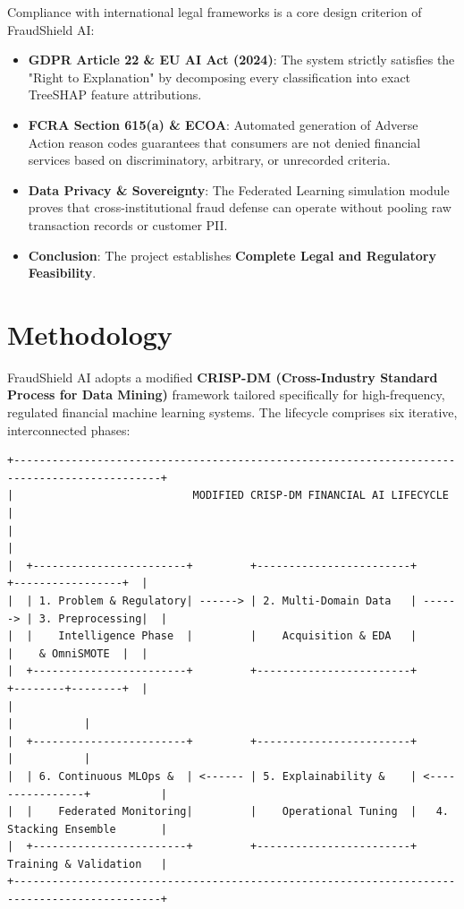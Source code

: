 \documentclass[12pt,a4paper,oneside]{report}
\begin{document}
Compliance with international legal frameworks is a core design criterion of FraudShield AI:

\begin{itemize}[leftmargin=0.35in]
\item \textbf{GDPR Article 22 \& EU AI Act (2024)}: The system strictly satisfies the "Right to Explanation" by decomposing every classification into exact TreeSHAP feature attributions.
\item \textbf{FCRA Section 615(a) \& ECOA}: Automated generation of Adverse Action reason codes guarantees that consumers are not denied financial services based on discriminatory, arbitrary, or unrecorded criteria.
\item \textbf{Data Privacy \& Sovereignty}: The Federated Learning simulation module proves that cross-institutional fraud defense can operate without pooling raw transaction records or customer PII.
\item \textbf{Conclusion}: The project establishes \textbf{Complete Legal and Regulatory Feasibility}.
\end{itemize}


\section{Methodology}

FraudShield AI adopts a modified \textbf{CRISP-DM (Cross-Industry Standard Process for Data Mining)} framework tailored specifically for high-frequency, regulated financial machine learning systems. The lifecycle comprises six iterative, interconnected phases:


\begin{lstlisting}
+---------------------------------------------------------------------------------------------+
|                            MODIFIED CRISP-DM FINANCIAL AI LIFECYCLE                         |
|                                                                                             |
|  +------------------------+         +------------------------+         +-----------------+  |
|  | 1. Problem & Regulatory| ------> | 2. Multi-Domain Data   | ------> | 3. Preprocessing|  |
|  |    Intelligence Phase  |         |    Acquisition & EDA   |         |    & OmniSMOTE  |  |
|  +------------------------+         +------------------------+         +--------+--------+  |
|                                                                                 |           |
|  +------------------------+         +------------------------+                  |           |
|  | 6. Continuous MLOps &  | <------ | 5. Explainability &    | <----------------+           |
|  |    Federated Monitoring|         |    Operational Tuning  |   4. Stacking Ensemble       |
|  +------------------------+         +------------------------+      Training & Validation   |
+---------------------------------------------------------------------------------------------+
\end{lstlisting}
\end{document}
